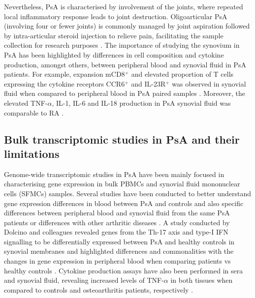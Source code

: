 Nevertheless, PsA is characterised by involvement of the joints, where repeated local inflammatory response leads to joint destruction. Oligoarticular PsA (involving four or fewer joints) is commonly managed by joint aspiration followed by intra-articular steroid injection to relieve pain, facilitating the sample collection for research purposes \parencite{Kavanaugh2006}. The importance of studying the synovium in PsA has been highlighted by differences in cell composition and cytokine production, amongst others, between peripheral blood and synovial fluid in PsA patients. For example, expansion mCD8$^+$ and elevated proportion of T cells expressing the cytokine receptors CCR6$^+$ and IL-23R$^+$ was observed in synovial fluid when compared to peripheral blood  in PsA paired samples \parencite{Ross2000,Benham2013}. Moreover, the elevated TNF-$\alpha$, IL-1, IL-6 and IL-18 production in PsA synovial fluid was comparable to RA \parencite{Kuijk2006}. 


\subsection{Bulk transcriptomic studies in PsA and their limitations}

Genome-wide transcriptomic studies in PsA have been mainly focused in characterising gene expression in bulk PBMCs and synovial fluid mononuclear cells (SFMCs) samples. Several studies have been conducted to better understand gene expression differences in blood between PsA and controls and also specific differences between peripheral blood and synovial fluid from the same PsA patients or differences with other arthritic diseases \parencite{Stoeckman2006, Batliwalla2005, Gu2002, Dolcino2015}. A study conducted by Dolcino and colleagues revealed genes from the Th-17 axis and type-I IFN signalling to be differentially expressed between PsA and healthy controls in synovial membranes and highlighted differences and commonalities with the changes in gene expression in peripheral blood when comparing patients vs healthy controls . %
Cytokine production assays have also been performed in sera and synovial fluid, revealing increased levels of TNF-$\alpha$ in both tissues when compared to controls and osteoarthritis patients, respectively \parencite{Ritchlin1998,Li2017}. 

